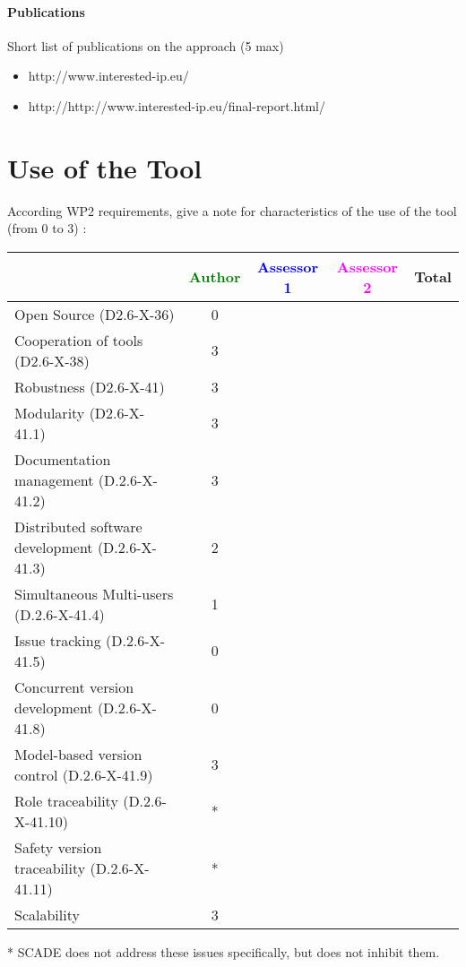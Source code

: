 \paragraph{Publications} Short list of publications on the approach (5 max)
\begin{itemize}
	\item http://www.interested-ip.eu/
  \item http://http://www.interested-ip.eu/final-report.html/

\end{itemize}


\section{Use of the Tool}
According WP2 requirements, give a note for characteristics of the use of the tool (from 0 to 3) :

\begin{tabular}{|l | c | c | c | c|}
\hline
& \textcolor{green}{Author} & \textcolor{blue}{Assessor 1} & \textcolor{magenta}{Assessor 2} & Total \\
\hline 
Open Source (D2.6-X-36) & 0& & &  \\
\hline 
Cooperation of tools (D2.6-X-38) & 3& & &  \\
\hline
Robustness (D2.6-X-41) & 3& & & \\
\hline
Modularity (D2.6-X-41.1) & 3& & & \\
\hline
Documentation management (D.2.6-X-41.2) & 3& & & \\
\hline
Distributed software development (D.2.6-X-41.3)  & 2& & & \\
\hline
Simultaneous Multi-users (D.2.6-X-41.4)   & 1& & & \\
\hline
Issue tracking (D.2.6-X-41.5) & 0& & & \\
\hline
Concurrent version development (D.2.6-X-41.8) & 0& & & \\
\hline
Model-based version control (D.2.6-X-41.9) & 3& & & \\
\hline
Role traceability (D.2.6-X-41.10) & *& & & \\
\hline
Safety version traceability (D.2.6-X-41.11) & *& & & \\
\hline
Scalability & 3& & & \\
\hline
\end{tabular}

\begin{author_comment}
* SCADE does not address these issues specifically, but does not inhibit them.
\end{author_comment}


